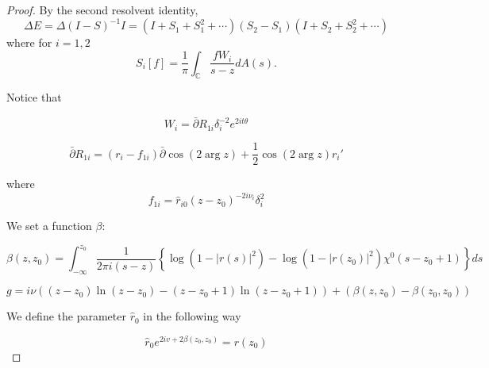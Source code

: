 \documentclass{amsart}
\theoremstyle{plain}
\theoremstyle{remark}
\numberwithin{equation}{section}
\newcommand{\Red}[1]{{\color{red} #1}}
\begin{document}
\begin{proof}
By the second resolvent identity, 
    \begin{equation}
   \Delta E=\Delta\left({I-S}\right)^{-1}I=(I+S_1+S_1^2+\cdots)(S_2-S_1)(I+S_2+S_2^2+\cdots)
\end{equation}
where for $i=1,2$
\begin{equation}
S_i[f]=\frac{1}{\pi} \int_{\mathbb{C}} \frac{f W_i}{s-z} d A(s).
\end{equation}

Notice that

\begin{equation}
W_i=\bar{\partial} R_{1i} \delta_i^{-2}e^{2it\theta}
\end{equation}

\begin{equation}
\bar{\partial} R_{1i}=(r_i-f_{1i})\bar{\partial}\cos(2\arg z)+\frac{1}{2}\cos(2\arg z)r_i'
\end{equation}

where
\begin{equation}
f_{1i}=\hat{r}_{i0}(z-z_0)^{-2i\nu_i}\delta_i^2
\end{equation}

We set a function $\beta$:

\begin{equation}
\beta(z,z_0)=\int_{-\infty}^{z_0}\frac{1}{2\pi i (s-z)}\left\{ \log(1-|r(s)|^2)-\log(1-|r(z_0)|^2)\chi^0(s-z_0+1) \right\}ds
\end{equation}

\begin{equation}
g=i\nu \left((z-z_0)\ln(z-z_0)-(z-z_0+1)\ln(z-z_0+1)\right)+(\beta(z,z_0)-\beta(z_0,z_0))
\end{equation}

We define the parameter $\hat{r}_0$ in the following way

\begin{equation}
\hat{r}_0e^{2iv+2\beta(z_0,z_0)}=r(z_0)
\end{equation}


\end{proof}
\end{document}
